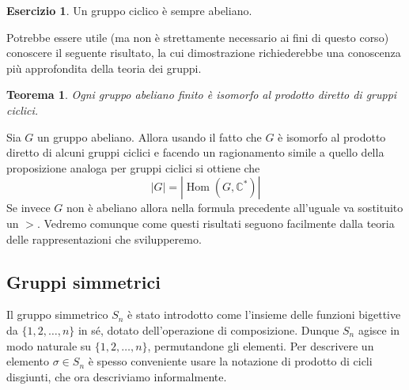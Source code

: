 \documentclass[11pt]{article}
\theoremstyle{plain}
\newtheorem{thm}{Teorema}[section]
\theoremstyle{definition}
\newtheorem{exercise}{Esercizio}[section]
\theoremstyle{remark}
\newcommand{\C}{\mathbb{C}}
\DeclareMathOperator{\Hom}{Hom}
\begin{document}
\begin{exercise} Un gruppo ciclico è sempre abeliano.
\end{exercise}

Potrebbe essere utile (ma non è strettamente necessario ai fini di questo corso) conoscere il seguente risultato, la cui dimostrazione richiederebbe una conoscenza più approfondita della teoria dei gruppi.
\begin{thm}Ogni gruppo abeliano finito è isomorfo al prodotto diretto di gruppi ciclici.
\end{thm}
Sia $G$ un gruppo abeliano. Allora usando il fatto che $G$ è isomorfo al prodotto diretto di alcuni gruppi ciclici e facendo un ragionamento simile a quello
della proposizione analoga per gruppi ciclici si ottiene che
\[ |G| = |\Hom(G,\C^*)|\]
Se invece $G$ non è abeliano allora nella formula precedente all'uguale va sostituito un $>$.
Vedremo comunque come questi risultati seguono facilmente dalla teoria delle rappresentazioni che svilupperemo.



\subsection{Gruppi simmetrici}
Il gruppo simmetrico $S_n$ è stato introdotto come l'insieme delle funzioni bigettive da $\{1,2,\dots,n\}$ in sé, dotato dell'operazione di composizione.
Dunque $S_n$ agisce in modo naturale su $\{1,2,\dots,n\}$, permutandone gli elementi. Per descrivere un elemento $\sigma \in S_n$
è spesso conveniente usare la notazione di prodotto di cicli disgiunti, che ora descriviamo informalmente.
\end{document}
